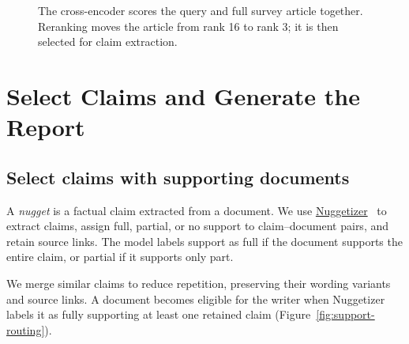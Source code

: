 \documentclass[11pt,letterpaper]{article}
\begin{document}
\begin{figure}[!ht]
\centering
{}
\caption{The cross-encoder scores the query and full survey article together. Reranking moves the article from rank 16 to rank 3; it is then selected for claim extraction.}
\label{fig:real-search}
\end{figure}
\FloatBarrier

\section{Select Claims and Generate the Report}
\subsection{Select claims with supporting documents}
A \emph{nugget} is a factual claim extracted from a document. We use \href{https://github.com/castorini/nuggetizer}{\textcolor{sea}{Nuggetizer}}~\textcolor{sea}{\cite{greatnuggetrecall}} to extract claims, assign full, partial, or no support to claim--document pairs, and retain source links. The model labels support as full if the document supports the entire claim, or partial if it supports only part.

We merge similar claims to reduce repetition, preserving their wording variants and source links. A document becomes eligible for the writer when Nuggetizer labels it as fully supporting at least one retained claim (Figure~\ref{fig:support-routing}).
\end{document}
